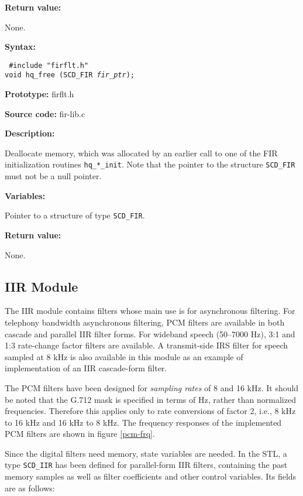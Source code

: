 {\bf Return value: }

        None.




{\bf Syntax: }

{\tt
\#include "firflt.h"\\
void hq\_free (SCD\_FIR {\em *fir\_ptr});
}

{\bf Prototype: }    firflt.h

{\bf Source code: }  fir-lib.c

{\bf Description: }

Deallocate memory, which was allocated by an earlier call to one of the
FIR initialization routines {\tt hq\_*\_init}. Note that the pointer to
the structure {\tt SCD\_FIR} must not be a null pointer.

{\bf Variables: }
\begin{Descr}{\DescrLen}
\item[\pbox{20mm}{\em fir\_ptr}] Pointer to a structure of type {\tt SCD\_FIR}.
\end{Descr}

{\bf Return value: }

None.


\subsection{IIR Module}

The IIR module contains filters whose main use is for asynchronous
filtering. For telephony bandwidth asynchronous filtering, PCM filters
are available in both cascade and parallel IIR filter forms. For
wideband speech (50--7000 Hz), 3:1 and 1:3 rate-change factor filters
are available. A transmit-side IRS filter for speech sampled at 8 kHz
is also available in this module as an example of implementation of an
IIR cascade-form filter.

The PCM filters have been designed for {\em sampling rates} of 8 and 16
kHz. It should be noted that the G.712 mask is specified in terms of Hz,
rather than normalized frequencies. Therefore this applies only to rate
conversions of factor 2, i.e., 8 kHz to 16 kHz and 16 kHz to 8 kHz.
The frequency responses of the implemented PCM filters are shown in
figure \ref{pcm-frq}.

Since the digital filters need memory, state variables are needed. In
the STL, a type {\tt SCD\_IIR} has been defined for parallel-form IIR
filters, containing the past memory samples as well as filter
coefficients and other control variables. Its fields are as follows:

